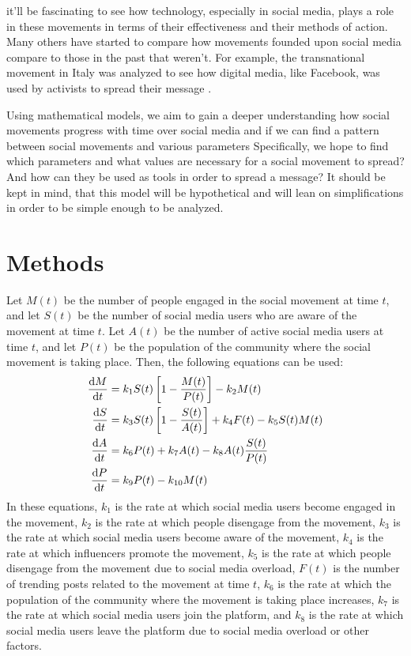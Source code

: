 \documentclass{article}
\begin{document}
    it'll be fascinating to see how technology, especially in social media, plays a role in these movements in terms of their effectiveness and their methods of action. Many others have started to compare how movements founded upon social media compare to those in the past that weren't. For example, the transnational movement in Italy was analyzed to see how digital media, like Facebook, was used by activists to spread their message \cite{pavan_digital_2019}. 

    Using mathematical models, we aim to gain a deeper understanding how social movements progress with time over social media and if we can find a pattern between social movements and various parameters Specifically, we hope to find which parameters and what values are necessary for a social movement to spread? And how can they be used as tools in order to spread a message?
    It should be kept in mind, that this model will be hypothetical and will lean on simplifications in order to be simple enough to be analyzed.
    
    \section{Methods}
        Let $M(t)$ be the number of people engaged in the social movement at time $t$, and let $S(t)$ be the number of social media users who are aware of the movement at time $t$. Let $A(t)$ be the number of active social media users at time $t$, and let $P(t)$ be the population of the community where the social movement is taking place. Then, the following equations can be used:
        \begin{align}
            \diff Mt &= k_1 S(t) \left[1 - \frac{M(t)}{P(t)}\right] - k_2M(t)
            \\
            \diff St &= k_3 S(t)\left[1 - \frac{S(t)}{A(t)}\right] + k_4 F(t) - k_5 S(t)M(t)
            \\
            \diff At &= k_6 P(t) + k_7A(t) - k_8A(t)\frac{S(t)}{P(t)}
            \\
            \diff Pt &= k_9 P(t) - k_{10}M(t)
        \end{align}
        In these equations, $k_1$ is the rate at which social media users become engaged in the movement, $k_2$ is the rate at which people disengage from the movement, $k_3$ is the rate at which social media users become aware of the movement, $k_4$ is the rate at which influencers promote the movement, $k_5$ is the rate at which people disengage from the movement due to social media overload, $F(t)$ is the number of trending posts related to the movement at time $t$, $k_6$ is the rate at which the population of the community where the movement is taking place increases, $k_7$ is the rate at which social media users join the platform, and $k_8$ is the rate at which social media users leave the platform due to social media overload or other factors.
        
\end{document}
